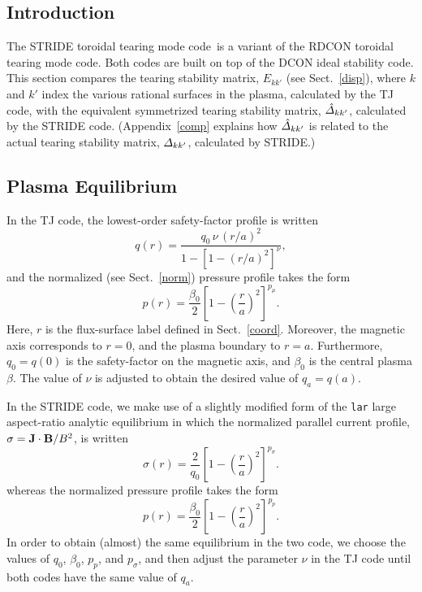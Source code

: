 \documentclass[12pt,prb,aps]{revtex4-1}
\begin{document}
\subsection{Introduction}
The STRIDE toroidal tearing mode code\,\cite{aglas1} is a variant of the RDCON toroidal tearing mode code.\cite{aglas2} Both codes are built on top of the
DCON ideal stability code.\cite{dcon} This section compares the tearing stability matrix, $E_{kk'}$ (see Sect.~\ref{disp}), where $k$ and $k'$ index the various rational surfaces in the
plasma, calculated by the TJ code, with the equivalent symmetrized tearing stability matrix, $\hat{\mit\Delta}_{kk'}$, calculated by the STRIDE code. (Appendix~\ref{comp} explains how
$\hat{\mit\Delta}_{kk'}$ is related to the actual tearing stability matrix, ${\mit\Delta}_{kk'}$, calculated by STRIDE.)

\subsection{Plasma Equilibrium}
In the TJ code, the lowest-order safety-factor profile is written
\begin{equation}
q(r) = \frac{q_0\,\nu\,(r/a)^2}{1-[1-(r/a)^2]^\nu},
\end{equation}
and the normalized (see Sect.~\ref{norm}) pressure profile takes the form
\begin{equation}
p(r) = \frac{\beta_0}{2}\left[1-\left(\frac{r}{a}\right)^2\right]^{p_\mu}.
\end{equation}
Here, $r$ is the flux-surface label defined in Sect.~\ref{coord}.  Moreover, the magnetic axis corresponds to $r=0$, and the plasma
boundary to $r=a$.  Furthermore, $q_0=q(0)$ is the safety-factor on the magnetic axis, and  $\beta_0$ is the central plasma $\beta$. 
The value of $\nu$ is adjusted to obtain the desired value of $q_a=q(a)$. 

In the  STRIDE code, we make use of a slightly modified form of the \verb|lar| large aspect-ratio analytic equilibrium in which the 
 normalized parallel current profile, $\sigma={\bf J}\cdot{\bf B}/B^2$,  is written
\begin{equation}
\sigma(r) = \frac{2}{q_0}\left[1-\left(\frac{r}{a}\right)^2\right]^{p_\sigma}.
\end{equation}
whereas the  normalized pressure profile takes the form
\begin{equation}
p(r)= \frac{\beta_0}{2}\left[1-\left(\frac{r}{a}\right)^2\right]^{p_p}.
\end{equation}
In order to obtain (almost) the same equilibrium in the two code, we choose the values of $q_0$, $\beta_0$, $p_p$, and $p_\sigma$, and then
adjust the parameter $\nu$ in the TJ code until both codes have the same value of $q_a$. 
\end{document}
